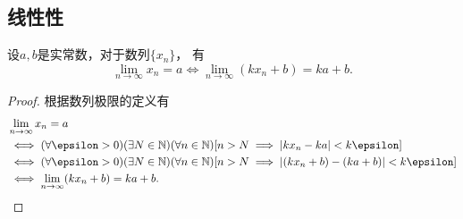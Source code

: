 \subsection{线性性}
\begin{theorem}[线性性]
设\(a,b\)是实常数，对于数列\(\{x_n\}\)，
有\begin{equation*}
	\lim_{n\to\infty} x_n = a
	\iff
	\lim_{n\to\infty} (k x_n + b) = k a + b.
\end{equation*}
\begin{proof}
根据数列极限的定义有\begin{align*}
	&\lim_{n\to\infty} x_n = a \\
	&\iff
	(\forall \epsilon > 0)
	(\exists N\in\mathbb{N})
	(\forall n\in\mathbb{N})
	[
		n > N
		\implies
		\abs{k x_n - k a} < k \epsilon
	] \\
	&\iff
	(\forall \epsilon > 0)
	(\exists N\in\mathbb{N})
	(\forall n\in\mathbb{N})
	[
		n > N
		\implies
		\abs{(k x_n + b) - (k a + b)} < k \epsilon
	] \\
	&\iff
	\lim_{n\to\infty} (k x_n + b) = k a + b.
	\qedhere
\end{align*}
\end{proof}
\end{theorem}
